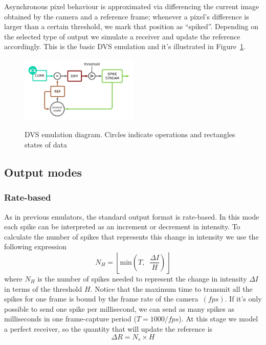 \documentclass[twocolumn]{article}
\begin{document}
Asynchronous pixel behaviour is approximated via differencing the current image obtained by the camera and a reference frame; whenever a pixel's difference is larger than a certain threshold, we mark that position as ``spiked''. Depending on the selected type of output we simulate a receiver and update the reference accordingly. This is the basic DVS emulation and it's illustrated in Figure~\ref{fig:dvs_emu}.

\begin{figure}[htb]
  \includegraphics[width=0.5\textwidth]{dvs_emu}
  \label{fig:dvs_emu}
  \caption{DVS emulation diagram. Circles indicate operations and rectangles states of data}
\end{figure}

\subsection{Output modes}
\subsubsection{Rate-based}
As in previous emulators\cite{dvs_emu}, the standard output format is rate-based. In this mode each spike can be interpreted as an increment or decrement in intensity. To calculate the number of spikes that represents this change in intensity we use the following expression
\begin{equation}
  \label{eq:num_spikes_rate}
  N_{H} = \left\lfloor \mathrm{min}\left( T, \;\; \frac{\Delta I}{H} \right) \right\rfloor
\end{equation}
where $N_{H}$ is the number of spikes needed to represent the change in intensity $\Delta I$ in terms of the threshold $H$. Notice that the maximum time to transmit all the spikes for one frame is bound by the frame rate of the camera~$(fps)$. If it's only possible to send one spike per millisecond, we can send as many spikes as milliseconds in one frame-capture period ($T = 1000/fps$). At this stage we model a perfect receiver, so the quantity that will update the reference is
\begin{equation}
  \label{eq:ref_update}
  \Delta R = N_{s}\times H
\end{equation}
\end{document}
